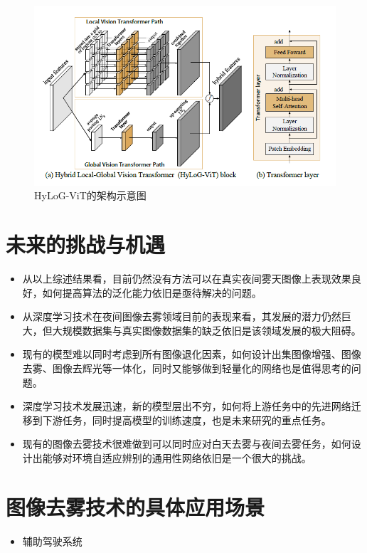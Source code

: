 \begin{multicols}{2}
 \begin{figure}[H]
 	\centering
 	\includegraphics[width=1.0\linewidth]{pics/screenshot008}
 	\caption{HyLoG-ViT的架构示意图}
 	\label{fig:screenshot008}
 \end{figure}
 

\section{未来的挑战与机遇}
\begin{itemize}
	\item 从以上综述结果看，目前仍然没有方法可以在真实夜间雾天图像上表现效果良好，如何提高算法的泛化能力依旧是亟待解决的问题。
	\item 从深度学习技术在夜间图像去雾领域目前的表现来看，其发展的潜力仍然巨大，但大规模数据集与真实图像数据集的缺乏依旧是该领域发展的极大阻碍。
	\item 现有的模型难以同时考虑到所有图像退化因素，如何设计出集图像增强、图像去雾、图像去辉光等一体化，同时又能够做到轻量化的网络也是值得思考的问题。
	\item 深度学习技术发展迅速，新的模型层出不穷，如何将上游任务中的先进网络迁移到下游任务，同时提高模型的训练速度，也是未来研究的重点任务。
	\item 现有的图像去雾技术很难做到可以同时应对白天去雾与夜间去雾任务，如何设计出能够对环境自适应辨别的通用性网络依旧是一个很大的挑战。
\end{itemize}

\section{图像去雾技术的具体应用场景}
\begin{itemize}
	\item 辅助驾驶系统
	

\end{itemize}
\end{multicols}
